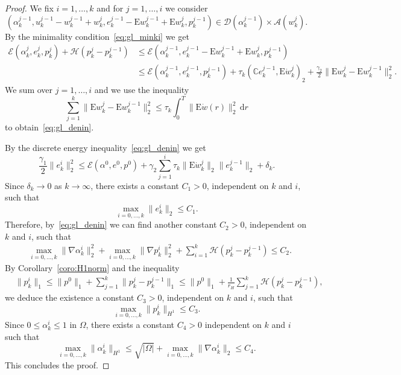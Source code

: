 \documentclass[reqno]{amsart}
\theoremstyle{definition}
\numberwithin{equation}{section}
\def\de {\mathrm{d}}
\def\C {\mathbb C}
\def\EE {\mathrm{E}}
\begin{document}
\begin{proof}
We fix $i=1,\dots,k$ and for $j=1,\dots,i$ we consider
$$(\alpha_k^{j-1},u_k^{j-1}-w_k^{j-1}+w_k^j,e_k^{j-1}-\EE w_k^{j-1}+\EE w_k^j,p_k^{j-1})\in \mathcal D(\alpha_k^{j-1})\times \mathcal A(w_k^j).$$
By the minimality condition~\eqref{eq:gl_minki}
we get
\begin{align*}
\mathcal E(\alpha_k^j,e_k^j,p_k^j)+\mathcal H(p_k^j-p_k^{j-1}) &\le \mathcal E(\alpha_k^{j-1},e_k^{j-1}-\EE w_k^{j-1}+\EE w_k^j,p_k^{j-1})\\
&\le\mathcal E(\alpha_k^{j-1},e_k^{j-1},p_k^{j-1})+\tau_k(\C e_k^{j-1},\EE \dot w_k^j)_2+\frac{\gamma_2}{2}\|\EE w_k^j-\EE w_k^{j-1}\|_2^2.
\end{align*}
We sum over $j=1,\dots,i$ and we use the inequality
\begin{equation*}
\sum_{j=1}^k\|\EE w_k^j-\EE w_k^{j-1}\|_2^2\le\tau_k\int_0^T\|\EE \dot w(r)\|_2^2\,\de r
\end{equation*}
to obtain~\eqref{eq:gl_denin}.

By the discrete energy inequality~\eqref{eq:gl_denin} we get
$$\frac{\gamma_1}{2}\|e_k^i\|_2^2\le \mathcal E(\alpha^0,e^0,p^0)+\gamma_2\sum_{j=1}^i\tau_k\|\EE \dot w_k^j\|_2\|e_k^{j-1}\|_2+\delta_k.$$
Since $\delta_k\to 0$ as $k\to\infty$, there exists a constant $C_1>0$, independent on $k$ and $i$, such that
$$\max_{i=0,\dots,k}\|e_k^i\|_2\le C_1.$$
Therefore, by~\eqref{eq:gl_denin} we can  find another constant $C_2>0$, independent on $k$ and $i$, such that
\begin{align*}
&\max_{i=0,\dots,k}\|\nabla\alpha_k^i\|_2^2+ \max_{i=0,\dots,k}\|\nabla p_k^i\|_2^2+\sum_{i=1}^k\mathcal H(p_k^j-p_k^{j-1})\le C_2.
\end{align*}
By Corollary~\ref{coro:H1norm} and the inequality 
\begin{align*}
&\|p_k^i\|_1\le \|p^0\|_1+\sum_{j=1}^k\|p_k^j-p_k^{j-1}\|_1\le \|p^0\|_1+\frac{1}{r_H}\sum_{j=1}^k\mathcal H(p_k^j-p_k^{j-1}),
\end{align*}
we deduce the existence a constant $C_3>0$, independent on $k$ and $i$, such that
\begin{equation*}\max_{i=0,\dots,k}\|p_k^i\|_{H^1}\le C_3.
\end{equation*}
Since $0\le \alpha_k^i\le 1$ in $\Omega$, there exists a constant $C_4>0$ independent on $k$ and $i$ such that
\begin{equation*}
\max_{i=0,\dots,k}\|\alpha_k^i\|_{H^1}\le\sqrt{|\Omega|}+\max_{i=0,\dots,k}\|\nabla\alpha_k^i\|_2\le C_4.
\end{equation*}
This concludes the proof.
\end{proof}
\end{document}
